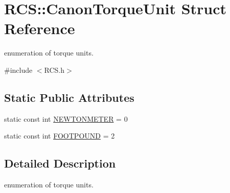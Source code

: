 \hypertarget{structRCS_1_1CanonTorqueUnit}{\section{R\-C\-S\-:\-:Canon\-Torque\-Unit Struct Reference}
\label{structRCS_1_1CanonTorqueUnit}
}


enumeration of torque units.  




{\ttfamily \#include $<$R\-C\-S.\-h$>$}

\subsection*{Static Public Attributes}
\begin{DoxyCompactItemize}
\item 
static const int \hyperlink{structRCS_1_1CanonTorqueUnit_ad6f5a1535c7a03c2034823a9ce461393}{N\-E\-W\-T\-O\-N\-M\-E\-T\-E\-R} = 0
\item 
static const int \hyperlink{structRCS_1_1CanonTorqueUnit_a98248bb91570aead308ba00dfc116ac7}{F\-O\-O\-T\-P\-O\-U\-N\-D} = 2
\end{DoxyCompactItemize}


\subsection{Detailed Description}
enumeration of torque units. 

